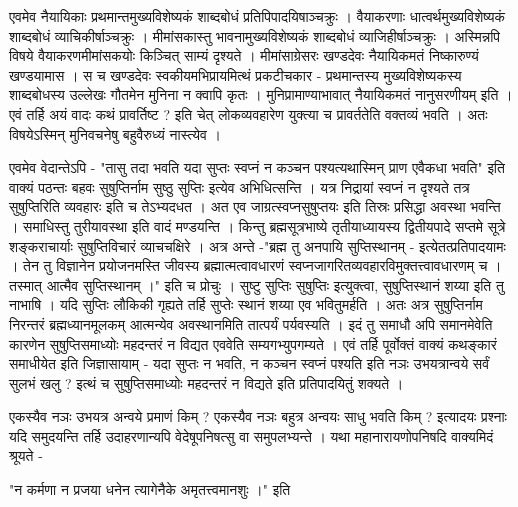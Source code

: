 एवमेव नैयायिकाः प्रथमान्तमुख्यविशेष्यकं शाब्दबोधं प्रतिपिपादयिषाञ्चक्रुः । वैयाकरणाः धात्वर्थमुख्यविशेष्यकं शाब्दबोधं व्याचिकीर्षाञ्चक्रुः । मीमांसकास्तु भावनामुख्यविशेष्यकं शाब्दबोधं व्याजिहीर्षाञ्चक्रुः । अस्मिन्नपि विषये वैयाकरणमीमांसकयोः किञ्चित् साम्यं दृश्यते । मीमांसाग्रेसरः खण्डदेवः नैयायिकमतं निष्कारुण्यं खण्डयामास । स च खण्डदेवः स्वकीयमभिप्रायमित्थं प्रकटीचकार - प्रथमान्तस्य मुख्यविशेष्यकस्य शाब्दबोधस्य उल्लेखः गौतमेन मुनिना न क्वापि कृतः । मुनिप्रामाण्याभावात् नैयायिकमतं नानुसरणीयम् इति । एवं तर्हि अयं वादः कथं प्रावर्तिष्ट ? इति चेत् लोकव्यवहारेण युक्त्या च प्रावर्ततेति वक्तव्यं भवति । अतः विषयेऽस्मिन् मुनिवचनेषु बहुवैरुध्यं नास्त्येव । 

एवमेव वेदान्तेऽपि - "तासु तदा भवति यदा सुप्तः स्वप्नं न कञ्चन पश्यत्यथास्मिन् प्राण एवैकधा भवति" इति वाक्यं पठन्तः बहवः सुषुप्तिर्नाम सुष्ठु सुप्तिः इत्येव अभिधित्सन्ति । यत्र निद्रायां स्वप्नं न दृश्यते तत्र सुषुप्तिरिति व्यवहारः इति च तेऽभ्यदधत । अत एव जाग्रत्स्वप्नसुषुप्तयः इति तिस्रः प्रसिद्धा अवस्था भवन्ति । समाधिस्तु तुरीयावस्था इति वादं मण्डयन्ति । किन्तु ब्रह्मसूत्रभाष्ये तृतीयाध्यायस्य द्वितीयपादे सप्तमे सूत्रे शङ्कराचार्याः सुषुप्तिविचारं व्याचचक्षिरे । अत्र अन्ते -"ब्रह्म तु अनपायि सुप्तिस्थानम् - इत्येतत्प्रतिपादयामः । तेन तु विज्ञानेन प्रयोजनमस्ति जीवस्य ब्रह्मात्मत्वावधारणं स्वप्नजागरितव्यवहारविमुक्तत्त्वावधारणम् च । तस्मात् आत्मैव सुप्तिस्थानम् ।" इति च प्रोचुः । सुष्टु सुप्तिः सुषुप्तिः इत्युक्त्वा, सुषुप्तिस्थानं शय्या इति तु नाभाषि । यदि सुप्तिः लौकिकी गृह्यते तर्हि सुप्तेः स्थानं शय्या एव भवितुमर्हति । अतः अत्र सुषुप्तिर्नाम निरन्तरं ब्रह्मध्यानमूलकम् आत्मन्येव अवस्थानमिति तात्पर्यं पर्यवस्यति । इदं तु समाधौ अपि समानमेवेति कारणेन सुषुप्तिसमाध्योः महदन्तरं न विद्यत एववेति सम्यगभ्युपगम्यते । एवं तर्हि पूर्वोक्तं वाक्यं कथङ्कारं समाधीयेत इति जिज्ञासायाम् - यदा सुप्तः न भवति, न कञ्चन स्वप्नं पश्यति इति नञः उभयत्रान्वये सर्वं सुलभं खलु ? इत्थं च सुषुप्तिसमाध्योः महदन्तरं न विद्यते इति प्रतिपादयितुं शक्यते । 

एकस्यैव नञः उभयत्र अन्वये प्रमाणं किम् ? एकस्यैव नञः बहुत्र अन्वयः साधु भवति किम् ? इत्यादयः प्रश्नाः यदि समुदयन्ति तर्हि उदाहरणान्यपि वेदेषूपनिषत्सु वा समुपलभ्यन्ते । यथा महानारायणोपनिषदि वाक्यमिदं श्रूयते - 

"न कर्मणा न प्रजया धनेन त्यागेनैके अमृतत्त्वमानशुः ।" इति

